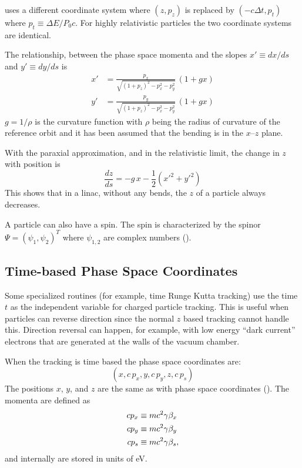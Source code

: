 \mad uses a different coordinate system where $(z, p_z)$ is replaced by $(-c\Delta t, p_t)$ where
$p_t \equiv \Delta E / P_0 c$. For highly relativistic particles the two coordinate systems are
identical.

The relationship, between the phase space momenta and the slopes $x' \equiv dx/ds$ and 
$y' \equiv dy/ds$ is
\begin{align}
  x' &= \frac{p_x}{\sqrt{(1 + p_z)^2 - p_x^2 - p_y^2}} \, (1 + g x) \\
  y' &= \frac{p_y}{\sqrt{(1 + p_z)^2 - p_x^2 - p_y^2}} \, (1 + g x) 
  \label{xpa1p}
\end{align}
$g = 1/\rho$ is the curvature function with $\rho$ being the radius of curvature of the reference
orbit and it has been assumed that the bending is in the $x$--$z$ plane.

With the paraxial approximation, and in the relativistic limit, the change in $z$ with position is
\begin{equation}
  \frac{dz}{ds} = -g \, x - \frac{1}{2} (x'^2 + y'^2)
\end{equation}
This shows that in a linac, without any bends, the $z$ of a particle always decreases.

A particle can also have a spin. The spin is characterized by the spinor $\Psi = \left( \psi_{1},
\psi_{2} \right)^{T}$ where $\psi_{1,2}$ are complex numbers ().

\subsection{Time-based Phase Space Coordinates}
\label{s:time.phase.space}

Some specialized routines (for example, time Runge Kutta tracking) use the time $t$ as the
independent variable for charged particle tracking. This is useful when particles can reverse
direction since the normal $z$ based tracking cannot handle this. Direction reversal can happen, for
example, with low energy ``dark current'' electrons that are generated at the walls of the vacuum
chamber.

When the tracking is time based the phase space coordinates are:
\begin{equation}
  (x, c \, p_x, y, c \, p_y, z, c \, p_s)
\end{equation}
The positions $x$, $y$, and $z$ are the same as with phase space coordinates
(). The momenta are defined as
\begin{align}
c p_x &\equiv m c^2 \gamma \beta_x \nonumber \\
c p_y &\equiv m c^2 \gamma \beta_y \\
c p_s &\equiv m c^2 \gamma \beta_s, \nonumber
\end{align}
and internally are stored in units of eV.

